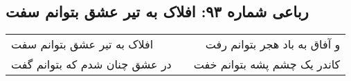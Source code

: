 \begin{center}
\section*{رباعی شماره ۹۳: افلاک به تیر عشق بتوانم سفت}
\label{sec:sh093}
\begin{longtable}{l p{0.5cm} r}
افلاک به تیر عشق بتوانم سفت
&&
و آفاق به باد هجر بتوانم رفت
\\
در عشق چنان شدم که بتوانم گفت
&&
کاندر یک چشم پشه بتوانم خفت
\\
\end{longtable}
\end{center}
